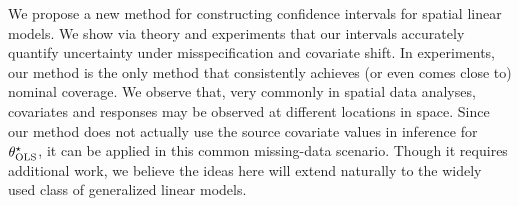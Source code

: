 We propose a new method for constructing confidence intervals for spatial linear models. We show via theory and experiments that our intervals accurately quantify uncertainty under misspecification and covariate shift. In experiments, our method is the only method that consistently achieves (or even comes close to) nominal coverage. We observe that, very commonly in spatial data analyses, covariates and responses may be observed at different locations in space. Since our method does not actually use the source covariate values in inference for $\theta^{\star}_{\text{OLS}}$, it can be applied in this common missing-data scenario. Though it requires additional work, we believe the ideas here will extend naturally to the widely used class of generalized linear models.





